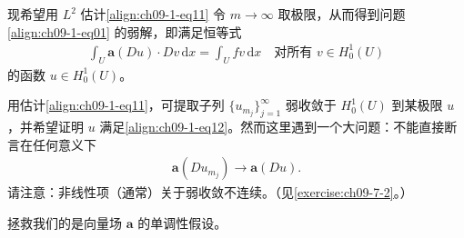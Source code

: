 \documentclass[../../main.tex]{subfiles}
\begin{document}
现希望用 $L^2$ 估计\eqref{align:ch09-1-eq11} 令 $m\to\infty$ 取极限，从而得到问题\eqref{align:ch09-1-eq01} 的弱解，即满足恒等式
\begin{align}
\int_U\mathbf{a}(Du)\cdot Dv\,\mathrm{d}x=\int_U fv\,\mathrm{d}x\quad\text{对所有 }v\in H_0^1(U)\label{align:ch09-1-eq12}
\end{align}
的函数 $u\in H_0^1(U)$。

用估计\eqref{align:ch09-1-eq11}，可提取子列 $\{u_{m_j}\}_{j=1}^\infty$ 弱收敛于 $H_0^1(U)$ 到某极限 $u$，并希望证明 $u$ 满足\eqref{align:ch09-1-eq12}。然而这里遇到一个大问题：不能直接断言在任何意义下
\begin{align*}
\mathbf{a}(Du_{m_j})\to\mathbf{a}(Du).
\end{align*}
请注意：非线性项（通常）关于弱收敛不连续。（见\cref{exercise:ch09-7-2}。）

拯救我们的是向量场 $\mathbf{a}$ 的单调性假设。
\end{document}
